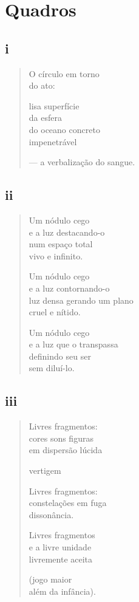 \chapter{Quadros}

\section{i}

\begin{verse}
O círculo em torno\\
do ato:

lisa superfície\\
da esfera\\
do oceano concreto\\
impenetrável

--- a verbalização do sangue.
\end{verse}

\medskip
\section{ii}

\begin{verse}
Um nódulo cego\\
e a luz destacando-o\\
num espaço total\\
vivo e infinito.

Um nódulo cego\\
e a luz contornando-o\\
luz densa gerando um plano\\
cruel e nítido.

Um nódulo cego\\
e a luz que o transpassa\\
definindo seu ser\\
sem diluí-lo.
\end{verse}

\medskip
\section{iii}

\begin{verse}
Livres fragmentos:\\
cores sons figuras\\
em dispersão lúcida

vertigem

Livres fragmentos:\\
constelações em fuga\\
dissonância.

Livres fragmentos\\
e a livre unidade\\
livremente aceita

(jogo maior\\
além da infância).
\end{verse}

